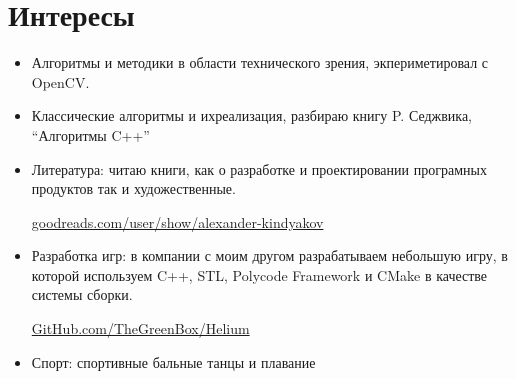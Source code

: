 \documentclass[a4paper, 11pt]{article}
\begin{document}
\section{Интересы}
\begin{itemize}
    \item Алгоритмы и методики в области технического зрения, экпериметировал с OpenCV.
    \item Классические алгоритмы и ихреализация, разбираю книгу P. Седжвика, ``Алгоритмы C++''
    \item Литература: читаю книги, как о разработке и проектировании програмных
продуктов так и художественные. 

\href{http://www.goodreads.com/user/show/24404721-alexander-kindyakov}{goodreads.com/user/show/alexander-kindyakov}    
    \item Разработка игр: в компании с моим другом разрабатываем небольшую игру, в которой
используем C++, STL, Polycode Framework и CMake в качестве системы сборки.
 
\href{https://github.com/thegreenbox/helium}{GitHub.com/TheGreenBox/Helium}
    \item Спорт: спортивные бальные танцы и плавание
\end{itemize}
\end{document}
